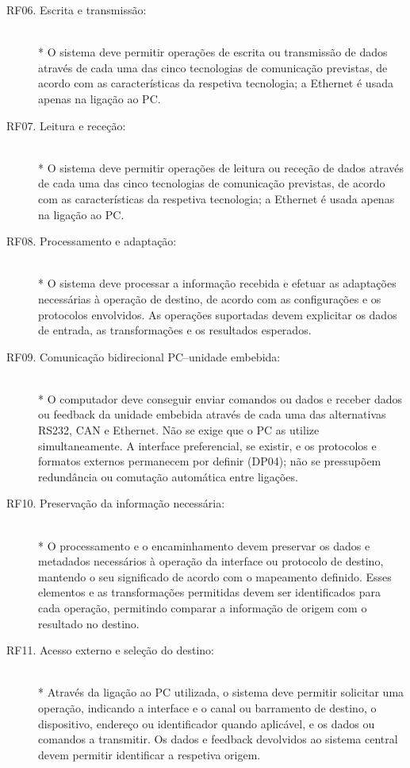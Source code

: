 \begin{description}
    \item[RF06. Escrita e transmissão:] \hfill\\*
    O sistema deve permitir operações de escrita ou transmissão de dados
    através de cada uma das cinco tecnologias de comunicação previstas, de acordo com as
    características da respetiva tecnologia; a Ethernet é usada apenas na
    ligação ao PC.

    \item[RF07. Leitura e receção:] \hfill\\*
    O sistema deve permitir operações de leitura ou receção de dados
    através de cada uma das cinco tecnologias de comunicação previstas, de acordo com as
    características da respetiva tecnologia; a Ethernet é usada apenas na
    ligação ao PC.

    \item[RF08. Processamento e adaptação:] \hfill\\*
    O sistema deve processar a informação recebida e efetuar as adaptações
    necessárias à operação de destino, de acordo com as configurações e
    os protocolos envolvidos. As operações suportadas devem explicitar
    os dados de entrada, as transformações e os resultados esperados.

    \item[RF09. Comunicação bidirecional PC--unidade embebida:] \hfill\\*
    O computador deve conseguir enviar comandos ou dados e receber
    dados ou feedback da unidade embebida através de cada uma das
    alternativas RS232, CAN e Ethernet. Não se exige que o PC as utilize
    simultaneamente. A interface preferencial, se existir, e os
    protocolos e formatos externos permanecem por definir (DP04);
    não se pressupõem redundância ou comutação automática entre ligações.

    \item[RF10. Preservação da informação necessária:] \hfill\\*
    O processamento e o encaminhamento devem preservar os dados e metadados
    necessários à operação da interface ou protocolo de destino, mantendo
    o seu significado de acordo com o mapeamento definido. Esses elementos
    e as transformações permitidas devem ser identificados para cada
    operação, permitindo comparar a informação de origem com o resultado
    no destino.

    \item[RF11. Acesso externo e seleção do destino:] \hfill\\*
    Através da ligação ao PC utilizada, o sistema deve permitir solicitar
    uma operação, indicando a interface e o canal ou barramento de destino,
    o dispositivo, endereço
    ou identificador quando aplicável, e os dados ou comandos a transmitir.
    Os dados e feedback devolvidos ao sistema central devem permitir
    identificar a respetiva origem.


\end{description}
